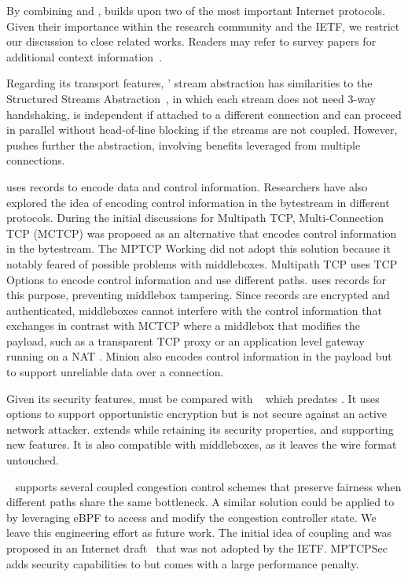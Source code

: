 
By combining \tcp and \tls, \tcpls builds upon two of the most important
Internet protocols. Given their importance within 
the research community and the IETF, we restrict our discussion to close
related works. Readers may refer to survey papers for additional 
context 
information~\cite{polese2019survey,li2016multipath,papastergiou2016ossifying}.

Regarding its transport features, \tcpls' stream abstraction has similarities to
the Structured Streams Abstraction~\cite{ford2007structured}, in which each
stream does not need 3-way handshaking, is independent if attached to a
different \tcp connection and can proceed in parallel without head-of-line
blocking if the streams are not coupled. However, \tcpls pushes further the
abstraction, involving benefits leveraged from multiple connections.

\tcpls uses \tls records to encode data and control information. Researchers
have also explored the idea of encoding control information in the bytestream in
different protocols. During the initial discussions for Multipath TCP,
Multi-Connection TCP (MCTCP) \cite{draft-scharf-mptcp-mctcp-01}
was proposed as an alternative that encodes control information in the bytestream.
The MPTCP Working did not adopt this solution because it notably feared of
possible problems with middleboxes. Multipath TCP \cite{raiciu2012hard,rfc6824}
uses TCP Options to encode control information and use different paths. \tcpls
uses \tls records for this purpose, preventing middlebox tampering.
Since \tls records are encrypted and
authenticated, middleboxes cannot interfere with the control information that
\tcpls exchanges in contrast with MCTCP where a middlebox that modifies the payload,
such as a transparent TCP proxy or an application level gateway running on a NAT \cite{3027}.
Minion \cite{nowlan2012fitting} also encodes control information in the \tcp
payload but to support unreliable data over a connection.



Given its security features, \tcpls must be compared with 
\tcpcrypt~\cite{bittau2010case,rfc8548} which predates . It uses \tcp 
options to support opportunistic encryption but is not secure against an active 
network attacker. \tcpls extends \tls while retaining its security 
properties, and supporting new features. It is also compatible with \tcp 
middleboxes, as it leaves the \tcp wire format untouched.

\mptcp~\cite{raiciu2012hard,rfc6824} supports several coupled congestion 
control schemes
\cite{peng2014multipath,wischik2011design,khalili2013mptcp} that preserve
fairness when different paths share the same bottleneck. A similar solution 
could be applied to \tcpls by leveraging eBPF to access and modify the 
congestion controller state. We leave this engineering effort as future work.
The initial idea of coupling \mptcp and \tls was proposed in an
Internet draft~\cite{draft-paasch-mptcp-ssl-00} that was not adopted by the
IETF. MPTCPSec~\cite{jadin2017securing} adds security capabilities to \mptcp but
comes with a large performance penalty.

